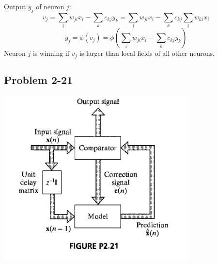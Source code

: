 \documentclass[paper=a4, fontsize=11pt]{scrartcl} %
\begin{document}
    Output $y_j$ of neuron $j$:
    \[ v_j = \sum_i w_{ji} x_i - \sum_k c_{kj} y_k = \sum_i w_{ji} x_i - \sum_k c_{kj} \sum_i w_{ki} x_i \]
    \[ y_j = \phi(v_j) = \phi \left( \sum_i w_{ji} x_i - \sum_k c_{kj} y_k \right) \]
    Neuron $j$ is winning if $v_j$ is larger than local fields of all other neurons.

    \subsection*{Problem 2-21}

    \begin{center}
        \setlength{\fboxsep}{0.5pt} %
        \setlength{\fboxrule}{0.5pt} %
        \includegraphics[width=10.0cm]{../images/Haykin-NN-figurep2-21.png} %
    \end{center}
\end{document}
